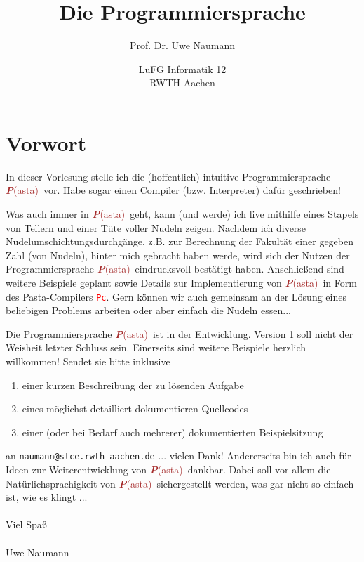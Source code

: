 \documentclass[11pt]{book}
\title{\bf Die Programmiersprache \Pasta}
\author{Prof. Dr. Uwe Naumann}
\date{
LuFG Informatik 12 \\
RWTH Aachen
}
\newcommand{\Pasta}{\textcolor{brown}{{\bf \em P}{\scriptsize{(asta)}}}}
\begin{document}
\pagestyle{plain}

\maketitle

\chapter*{Vorwort}

In dieser Vorlesung stelle ich die (hoffentlich) intuitive Programmiersprache
\Pasta\ vor. Habe sogar einen Compiler (bzw. Interpreter) daf\"ur 
geschrieben! 

Was auch immer in \Pasta\ geht, kann (und werde) ich live
mithilfe eines Stapels von Tellern und einer 
T\"ute voller Nudeln
zeigen. Nachdem ich diverse Nudelumschichtungsdurchg\"ange, z.B.
zur Berechnung der Fakult\"at einer gegeben Zahl (von Nudeln), hinter mich
gebracht haben werde, wird sich der Nutzen der Programmiersprache \Pasta\
eindrucksvoll best\"atigt haben. 
Anschlie\ss end sind weitere Beispiele geplant sowie Details zur 
Implementierung von \Pasta\ in Form des Pasta-Compilers 
\textcolor{red}{\tt Pc}. Gern k\"onnen wir auch gemeinsam an der 
L\"osung eines beliebigen Problems arbeiten oder aber einfach die
Nudeln essen...

Die Programmiersprache \Pasta\ ist in der Entwicklung. Version 1 soll nicht
der Weisheit letzter Schluss sein. Einerseits sind
weitere Beispiele herzlich willkommen! Sendet sie bitte
inklusive 
\begin{enumerate}
\item einer kurzen Beschreibung der zu l\"osenden Aufgabe
\item eines m\"oglichst detailliert dokumentieren Quellcodes
\item einer (oder bei Bedarf auch mehrerer) dokumentierten Beispielsitzung
\end{enumerate}
an
\color{blue}
{\tt naumann@stce.rwth-aachen.de}
\color{black}
... vielen Dank!
Andererseits bin ich auch f\"ur Ideen zur Weiterentwicklung von
\Pasta\ dankbar. Dabei soll vor allem die Nat\"urlichsprachigkeit von
\Pasta\ sichergestellt werden, was gar nicht so einfach ist, wie es 
klingt ... \\
\\
Viel Spa\ss \\
\\
Uwe Naumann
\vfill
\end{document}
